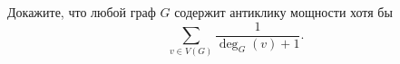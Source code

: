 Докажите, что любой граф $G$ содержит антиклику мощности хотя бы
$$
    \sum\limits_{v \in V(G)} \frac{1}{\deg_{G}(v) + 1}.
$$ 